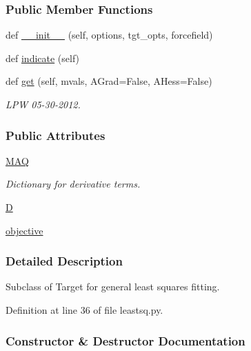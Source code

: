 \subsubsection*{Public Member Functions}
\begin{DoxyCompactItemize}
\item 
def \hyperlink{classsrc_1_1leastsq_1_1LeastSquares_a92540b3f42bc00f5a712507c58d65abd}{\+\_\+\+\_\+init\+\_\+\+\_\+} (self, options, tgt\+\_\+opts, forcefield)
\item 
def \hyperlink{classsrc_1_1leastsq_1_1LeastSquares_a069649328a4279cf2548636a09611630}{indicate} (self)
\item 
def \hyperlink{classsrc_1_1leastsq_1_1LeastSquares_a4e586dda3fc35ba842ca972bc296f1f3}{get} (self, mvals, A\+Grad=False, A\+Hess=False)
\begin{DoxyCompactList}\small\item\em L\+PW 05-\/30-\/2012. \end{DoxyCompactList}\end{DoxyCompactItemize}
\subsubsection*{Public Attributes}
\begin{DoxyCompactItemize}
\item 
\hyperlink{classsrc_1_1leastsq_1_1LeastSquares_a32ee7af48e079e88362d1a3f9cef293d}{M\+AQ}
\begin{DoxyCompactList}\small\item\em Dictionary for derivative terms. \end{DoxyCompactList}\item 
\hyperlink{classsrc_1_1leastsq_1_1LeastSquares_a4b7d42bb706dc5a4c32a0db0a9eb489a}{D}
\item 
\hyperlink{classsrc_1_1leastsq_1_1LeastSquares_add53989a9dd606903f90c11e4e07f206}{objective}
\end{DoxyCompactItemize}


\subsubsection{Detailed Description}
Subclass of Target for general least squares fitting. 



Definition at line 36 of file leastsq.\+py.



\subsubsection{Constructor \& Destructor Documentation}
\mbox{\label{classsrc_1_1leastsq_1_1LeastSquares_a92540b3f42bc00f5a712507c58d65abd}} 
